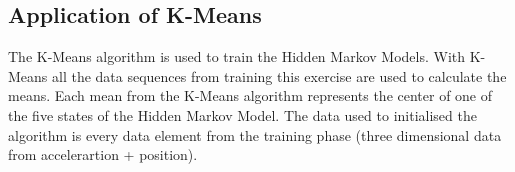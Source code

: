 \subsection{Application of K-Means}
The K-Means algorithm is used to train the Hidden Markov Models. With K-Means all the data sequences from training this exercise are used to calculate the means. Each mean from the K-Means algorithm represents the center of one of the five states of the Hidden Markov Model. The data used to initialised the algorithm is every data element from the training phase (three dimensional data from accelerartion + position).  

